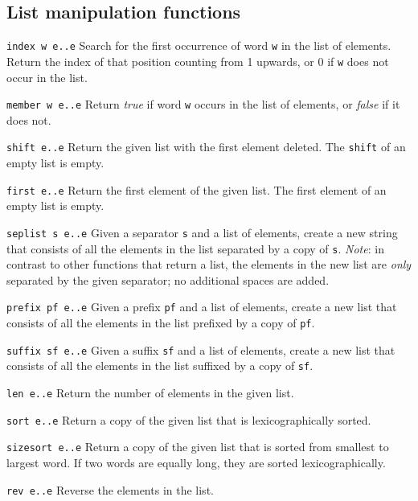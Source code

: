 \subsection{List manipulation functions}

\begin{desctab}
\item[\texttt{index w e..e}]
Search for the first occurrence of word \texttt{w} in the list of elements.
Return the index of that position counting from 1 upwards,
or 0 if \texttt{w} does not occur in the list.

\item[\texttt{member w e..e}]
Return \textit{true} if word \verb'w' occurs in the list of elements,
or \textit{false} if it does not.

\item[\texttt{shift e..e}]
Return the given list with the first element deleted.
The \texttt{shift} of an empty list is empty.

\item[\texttt{first e..e}]
Return the first element of the given list.
The first element of an empty list is empty.

\item[\texttt{seplist s e..e}]
Given a separator \texttt{s} and a list of elements, create a new string
that consists of all the elements in the list separated by a copy of
\texttt{s}.  \emph{Note}: in contrast to other functions that return a list,
the elements in the new list are \emph{only} separated by the given
separator; no additional spaces are added.

\item[\texttt{prefix pf e..e}]
Given a prefix \texttt{pf} and a list of elements,
create a new list that
consists of all the elements in the list prefixed by a copy of \texttt{pf}.

\item[\texttt{suffix sf e..e}]
Given a suffix \texttt{sf} and a list of elements,
create a new list that
consists of all the elements in the list suffixed by a copy of \texttt{sf}.

\item[\texttt{len e..e}]
Return the number of elements in the given list.

\item[\texttt{sort e..e}]
Return a copy of the given list that is lexicographically sorted.

\item[\texttt{sizesort e..e}]
Return a copy of the given list that is sorted from smallest to largest
word. If two words are equally long, they are sorted lexicographically.

\item[\texttt{rev e..e}]
Reverse the elements in the list.
\end{desctab}
